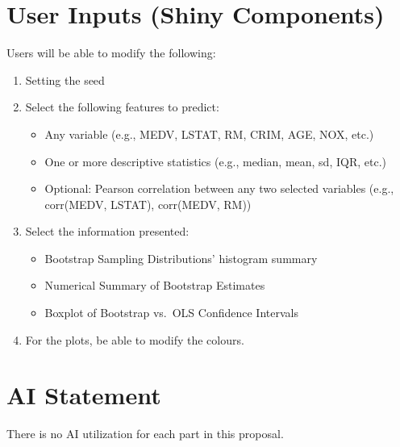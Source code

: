 \documentclass{article}
\begin{document}
        \section{User Inputs (Shiny Components)}
Users will be able to modify the following:
\begin{enumerate}
  \item Setting the seed
  \item Select the following features to predict:
  \begin{itemize}
    \item Any variable (e.g., MEDV, LSTAT, RM, CRIM, AGE, NOX, etc.)
    \item One or more descriptive statistics (e.g., median, mean, sd, IQR, etc.)
    \item Optional: Pearson correlation between any two selected variables (e.g., corr(MEDV, LSTAT), corr(MEDV, RM))
  \end{itemize}
  \item Select the information presented:
  \begin{itemize}
    \item[-] Bootstrap Sampling Distributions' histogram summary
    \item[-] Numerical Summary of Bootstrap Estimates
    \item[-] Boxplot of Bootstrap vs.\ OLS Confidence Intervals
  \end{itemize}
  \item For the plots, be able to modify the colours.
\end{enumerate}



\section*{AI Statement}
There is no AI utilization for each part in this proposal.

\nocite{*}


\vspace{0.8cm}
\end{document}
